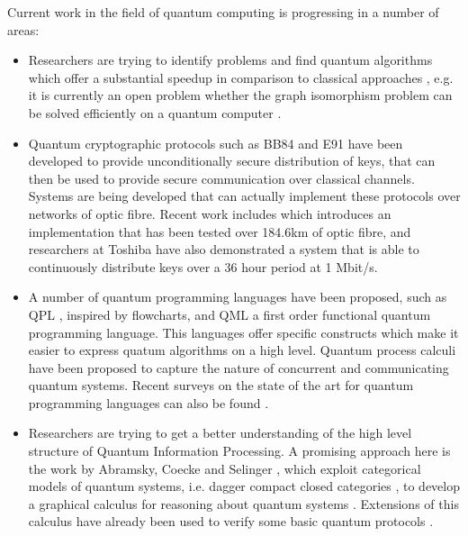 \documentclass[a4paper]{article}
\begin{document}
Current work in the field of quantum computing is progressing in a number 
of areas:
\begin{itemize}
\item
Researchers are trying to identify problems and find quantum algorithms which
offer a substantial speedup in comparison to classical approaches
, e.g. it is currently an open problem whether the graph
isomorphism problem can be solved efficiently on a quantum computer
.  
\item
Quantum cryptographic protocols such as BB84  and E91
 have been developed to provide unconditionally secure
distribution of keys, that can then be used to provide secure
communication over classical channels. Systems are being developed
that can actually implement these protocols over networks of optic
fibre. Recent work includes  which introduces an
implementation that has been tested over 184.6km of optic fibre, 
and researchers at Toshiba  have also
demonstrated a system that is able to continuously distribute keys
over a 36 hour period at 1 Mbit/s. 
\item A number of quantum programming languages have been proposed,
  such as QPL , inspired by flowcharts, and QML
   a first order functional quantum
  programming language. This languages offer specific constructs which
  make it easier to express quatum algorithms on a high level.
  Quantum process calculi  have been proposed to capture
  the nature of concurrent and communicating quantum systems.  Recent
  surveys on the state of the art for quantum programming languages
  can also be found .
\item
Researchers are trying 
to get a better understanding of the
high level structure of Quantum Information Processing. A promising approach here
is the work by Abramsky, Coecke and Selinger , 
which exploit
categorical models of quantum systems, i.e. dagger compact closed
categories , to develop a graphical calculus for reasoning about
quantum systems . Extensions of this calculus have already
been used to verify some basic quantum protocols .
\end{itemize}
\end{document}

